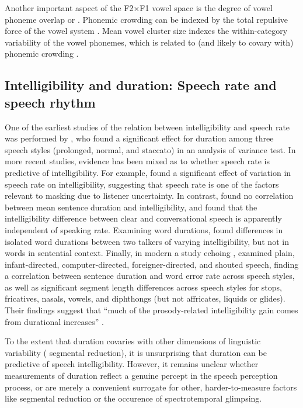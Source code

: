 Another important aspect of the F2×F1 vowel space is the degree of vowel phoneme overlap or .  Phonemic crowding can be indexed by the total repulsive force of the vowel system \citep[see][]{McCloyEtAl2013}.  Mean vowel cluster size indexes the within-category variability of the vowel phonemes, which is related to (and likely to covary with) phonemic crowding \citep{McCloyEtAl2013}.  


\subsection[Intelligibility and duration]{Intelligibility and duration: Speech rate and speech rhythm\label{sec:IntelDur}}
One of the earliest studies of the relation between intelligibility and speech rate was performed by \citet{Tolhurst1957a}, who found a significant effect for duration among three speech styles (prolonged, normal, and staccato) in an analysis of variance test.  In more recent studies, evidence has been mixed as to whether speech rate is predictive of intelligibility.  For example, \citet{SommersEtAl1994} found a significant effect of variation in speech rate on intelligibility, suggesting that speech rate is one of the factors relevant to masking due to listener uncertainty.  In contrast, \citet{BradlowEtAl1996} found no correlation between mean sentence duration and intelligibility, and \citet{KrauseBraida2002} found that the intelligibility difference between clear and conversational speech is apparently independent of speaking rate.  Examining word durations, \citet{BondMoore1994} found differences in isolated word durations between two talkers of varying intelligibility, but not in words in sentential context.  Finally, in modern a study echoing \citet{Tolhurst1957a}, \citet{MayoEtAl2012} examined plain, infant-directed, computer-directed, foreigner-directed, and shouted speech, finding a correlation between sentence duration and word error rate across speech styles, as well as significant segment length differences across speech styles for stops, fricatives, nasals, vowels, and diphthongs (but not affricates, liquids or glides).  Their findings suggest that “much of the prosody-related intelligibility gain comes from durational increases” \citep{MayoEtAl2012}.

To the extent that duration covaries with other dimensions of linguistic variability (\eg{} segmental reduction), it is unsurprising that duration can be predictive of speech intelligibility.  However, it remains unclear whether measurements of duration reflect a genuine percept in the speech perception process, or are merely a convenient surrogate for other, harder-to-measure factors like segmental reduction or the occurence of spectrotemporal glimpsing.

